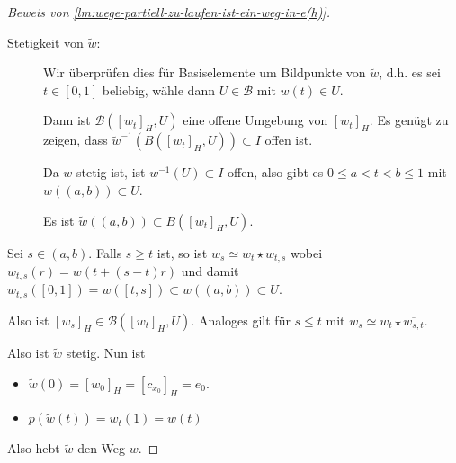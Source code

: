 \begin{proof}[Beweis von \autoref{lm:wege-partiell-zu-laufen-ist-ein-weg-in-e(h)}]
    \begin{description}
        \item[Stetigkeit von $\tilde{w}$:] 
            Wir überprüfen dies für Basiselemente um Bildpunkte von $\tilde{w}$, d.h. es sei $t\in [0,1]$ beliebig, wähle dann $U\in \mathcal{B}$ mit $w(t) \in U$.

            Dann ist $\mathcal{B}([w_t]_H, U)$ eine offene Umgebung von $[w_t]_H$. Es genügt zu zeigen, dass  $\tilde{w}^{-1}(B([w_t]_H, U))\subset I$ offen ist.

    Da $w$ stetig ist, ist $w^{-1}(U)\subset I$ offen, also gibt es $0\leq a < t < b \leq 1$ mit $w((a,b)) \subset U$.
\begin{claim}
    Es ist $\tilde{w}((a,b)) \subset B([w_t]_H, U)$.
\end{claim}
    \end{description}

    \begin{subproof}
        Sei $s\in (a,b)$. Falls $s\geq t$ ist, so ist $w_s \simeq w_t \star w_{t,s}$ wobei $w_{t,s}(r) = w(t + (s-t)r)$ und damit $w_{t,s}([0,1]) = w([t,s]) \subset w((a,b)) \subset U $.

        Also ist $[w_s]_H \in \mathcal{B}([w_t]_H, U)$. Analoges gilt für $s\leq t$ mit $w_s \simeq w_t \star \overline{w_{s,t}}$.
    \end{subproof}
    Also ist $\tilde{w}$ stetig. Nun ist
    \begin{itemize}
        \item $\tilde{w}(0) = [w_0]_H = [c_{x_0}]_H = e_0$.
        \item $p(\tilde{w}(t)) = w_t (1) = w(t)$
    \end{itemize}
    Also hebt $\tilde{w}$ den Weg  $w$.
\end{proof}


